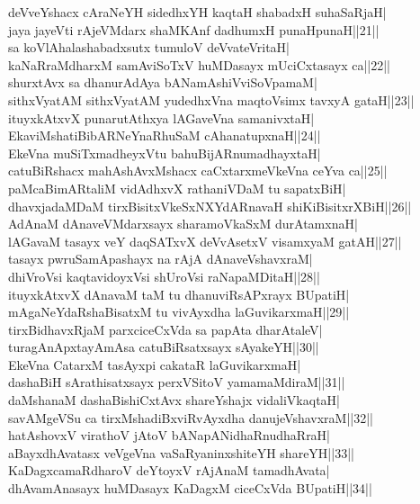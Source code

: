 \documentclass{article}
\begin{document}
deVveYshacx cAraNeYH sidedhxYH kaqtaH shabadxH suhaSaRjaH|\\
jaya jayeVti rAjeVMdarx shaMKAnf dadhumxH punaHpunaH||21||\\
sa koVlAhalashabadxsutx tumuloV deVvateVritaH|\\
kaNaRraMdharxM samAviSoTxV huMDasayx mUciCxtasayx ca||22||\\
shurxtAvx sa dhanurAdAya bANamAshiVviSoVpamaM|\\
sithxVyatAM sithxVyatAM yudedhxVna maqtoVsimx tavxyA gataH||23||\\
ituyxkAtxvX punarutAthxya lAGaveVna samanivxtaH|\\
EkaviMshatiBibARNeYnaRhuSaM cAhanatupxnaH||24||\\
EkeVna muSiTxmadheyxVtu bahuBijARnumadhayxtaH|\\
catuBiRshacx mahAshAvxMshacx caCxtarxmeVkeVna ceYva ca||25||\\
paMcaBimARtaliM vidAdhxvX rathaniVDaM tu sapatxBiH|\\
dhavxjadaMDaM tirxBisitxVkeSxNXYdARnavaH shiKiBisitxrXBiH||26||\\
AdAnaM dAnaveVMdarxsayx sharamoVkaSxM durAtamxnaH|\\
lAGavaM tasayx veY daqSATxvX deVvAsetxV visamxyaM gatAH||27||\\
tasayx pwruSamApashayx na rAjA dAnaveVshavxraM|\\
dhiVroVsi kaqtavidoyxVsi shUroVsi raNapaMDitaH||28||\\
ituyxkAtxvX dAnavaM taM tu dhanuviRsAPxrayx BUpatiH|\\
mAgaNeYdaRshaBisatxM tu vivAyxdha laGuvikarxmaH||29||\\
tirxBidhavxRjaM parxciceCxVda sa papAta dharAtaleV|\\
turagAnApxtayAmAsa catuBiRsatxsayx sAyakeYH||30||\\
EkeVna CatarxM tasAyxpi cakataR laGuvikarxmaH|\\
dashaBiH sArathisatxsayx perxVSitoV yamamaMdiraM||31||\\
daMshanaM dashaBishiCxtAvx shareYshajx vidaliVkaqtaH|\\
savAMgeVSu ca tirxMshadiBxviRvAyxdha danujeVshavxraM||32||\\
hatAshovxV virathoV jAtoV bANapANidhaRnudhaRraH|\\
aBayxdhAvatasx veVgeVna vaSaRyaninxshiteYH shareYH||33||\\
KaDagxcamaRdharoV deYtoyxV rAjAnaM tamadhAvata|\\
dhAvamAnasayx huMDasayx KaDagxM ciceCxVda BUpatiH||34||\\
\end{document}
